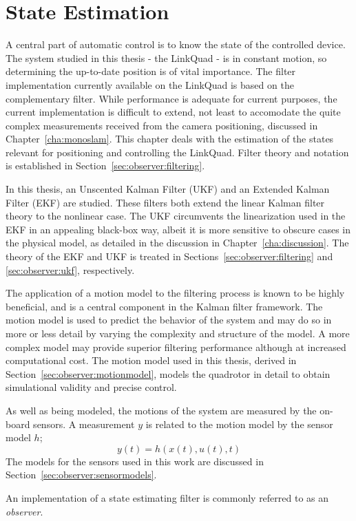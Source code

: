 \chapter{State Estimation}
\label{cha:observer}
    A central part of automatic control is to know the state of the controlled device.
    The system studied in this thesis - the LinkQuad - is in constant
    motion, so determining the up-to-date position is of vital importance.
    The filter implementation currently available on the LinkQuad is
    based on the complementary filter. While performance is adequate for
    current purposes, the current implementation is difficult to extend, not least
    to accomodate the quite complex measurements received from the camera positioning,
    discussed in Chapter~\ref{cha:monoslam}.
    This chapter deals with the estimation of the states relevant for positioning
    and controlling the LinkQuad.
    Filter theory and notation is established in Section~\ref{sec:observer:filtering}.

    In this thesis, an Unscented Kalman Filter (UKF) and an Extended Kalman Filter (EKF) are studied.
    These filters both extend the linear Kalman filter theory to the nonlinear case.
    The UKF circumvents the linearization used in the EKF in an appealing black-box way,
    albeit it is more sensitive to obscure cases in the physical model,
    as detailed in the discussion in Chapter~\ref{cha:discussion}.
    The theory of the EKF and UKF is treated in
    Sections~\ref{sec:observer:filtering} and \ref{sec:observer:ukf}, respectively.

    The application of a motion model to the filtering process is known to
    be highly beneficial, and is a central component in the Kalman filter framework.
    The motion model is used to predict the behavior of the system and may do
    so in more or less detail by varying the complexity and structure of the model.
    A more complex model may provide superior filtering performance although
    at increased computational cost. The motion model used in this thesis,
    derived in Section~\ref{sec:observer:motionmodel}, models the quadrotor
    in detail to obtain simulational validity and precise control.

    As well as being modeled, the motions of the system are measured by the on-board sensors.
    A measurement $y$ is related to the motion model by the sensor model $h$;
    \begin{equation}
        y(t) = h(x(t),u(t),t)
    \end{equation}
    The models for the sensors used in this work are discussed in Section~\ref{sec:observer:sensormodels}.

    An implementation of a state estimating filter is commonly referred to as an \textit{observer}.

    
    
    
    
